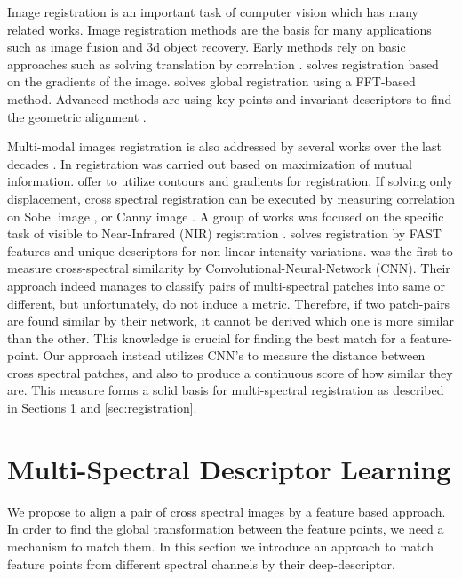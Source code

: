 \documentclass[10pt,twocolumn,letterpaper]{article}
\begin{document}
Image registration is an important task of computer vision which has many related works. Image registration methods \cite{survey,zitovaSurvey} are the basis for many applications such as image fusion and 3d object recovery. Early methods rely on basic approaches such as solving translation by correlation \cite{correlation}. \cite{lucas1981iterative} solves registration based on the gradients of the image. \cite{reddy1996fft} solves global registration using a FFT-based method. Advanced methods are using key-points \cite{harris,SIFT} and invariant descriptors to find the geometric alignment \cite{SIFT_Registration}.

Multi-modal images registration is also addressed by several works over the last decades \cite{chen2015sirf,shen2014multi}. In \cite{mutualInformaion} registration was carried out based on maximization of mutual information. \cite{multiSpectralSIFT,irani1998robust,keller2006multisensor,li1995contour} offer to utilize contours and gradients for registration. If solving only displacement, cross spectral registration can be executed by measuring correlation on Sobel image \cite{sobel}, or Canny image \cite{Canny}. A group of works was focused on the specific task of visible to Near-Infrared (NIR) registration \cite{multiSpectralSIFT,keller2006multisensor}.  \cite{lghd2015} solves registration by FAST features \cite{takacs2010unified} and unique descriptors for non linear intensity variations. \cite{aguilera2016learning} was the first to measure cross-spectral similarity by Convolutional-Neural-Network (CNN). Their approach indeed manages to classify pairs of multi-spectral patches into same or different, but unfortunately, do not induce a metric. Therefore, if two patch-pairs are found similar by their network, it cannot be derived which one is more similar than the other. This knowledge is crucial for finding the best match for a feature-point. Our approach instead utilizes CNN's to measure the distance between cross spectral patches, and also to produce a continuous score of how similar they are. This measure forms a solid basis for multi-spectral registration as described in Sections \ref{sec:descriptor} and \ref{sec:registration}.

\section{Multi-Spectral Descriptor Learning} \label{sec:descriptor}

We propose to align a pair of cross spectral images by a feature based approach. In order to find the global transformation between the feature points, we need a mechanism to match them. In this section we introduce an approach to match feature points from different spectral channels by their deep-descriptor.
\end{document}
